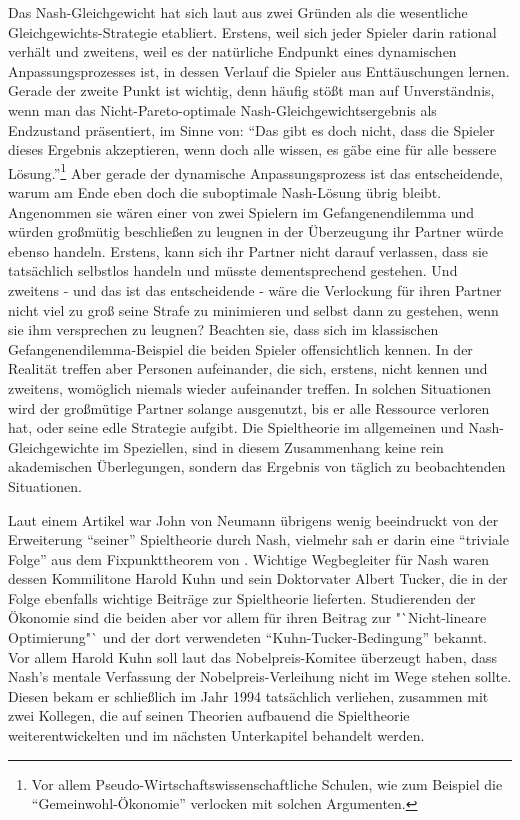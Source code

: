 Das Nash-Gleichgewicht hat sich laut \textcite[S. 61]{Holler2005} aus zwei Gründen als die wesentliche Gleichgewichts-Strategie etabliert. Erstens, weil sich jeder Spieler darin rational verhält und zweitens, weil es der natürliche Endpunkt eines dynamischen Anpassungsprozesses ist, in dessen Verlauf die Spieler aus Enttäuschungen lernen. Gerade der zweite Punkt ist wichtig, denn häufig stößt man auf Unverständnis, wenn man das Nicht-Pareto-optimale Nash-Gleichgewichtsergebnis als Endzustand präsentiert, im Sinne von: "`Das gibt es doch nicht, dass die Spieler dieses Ergebnis akzeptieren, wenn doch alle wissen, es gäbe eine für alle bessere Lösung."'\footnote{Vor allem Pseudo-Wirtschaftswissenschaftliche Schulen, wie zum Beispiel die "`Gemeinwohl-Ökonomie"' verlocken mit solchen Argumenten.} Aber gerade der dynamische Anpassungsprozess ist das entscheidende, warum am Ende eben doch die suboptimale Nash-Lösung übrig bleibt. Angenommen sie wären einer von zwei Spielern im Gefangenendilemma und würden großmütig beschließen zu leugnen in der Überzeugung ihr Partner würde ebenso handeln. Erstens, kann sich ihr Partner nicht darauf verlassen, dass sie tatsächlich selbstlos handeln und müsste dementsprechend gestehen. Und zweitens - und das ist das entscheidende - wäre die Verlockung für ihren Partner nicht viel zu groß seine Strafe zu minimieren und selbst dann zu gestehen, wenn sie ihm versprechen zu leugnen? Beachten sie, dass sich im klassischen Gefangenendilemma-Beispiel die beiden Spieler offensichtlich kennen. In der Realität treffen aber Personen aufeinander, die sich, erstens, nicht kennen und zweitens, womöglich niemals wieder aufeinander treffen. In solchen Situationen wird der großmütige Partner solange ausgenutzt, bis er alle Ressource verloren hat, oder seine edle Strategie aufgibt. Die Spieltheorie im allgemeinen und Nash-Gleichgewichte im Speziellen, sind in diesem Zusammenhang keine rein akademischen Überlegungen, sondern das Ergebnis von täglich zu beobachtenden Situationen.

Laut einem Artikel \textcite{Cassidy2015} war John von Neumann übrigens wenig beeindruckt von der Erweiterung "`seiner"' Spieltheorie durch Nash, vielmehr sah er darin eine "`triviale Folge"' aus dem Fixpunkttheorem von \textcite{Brouwer1912}. Wichtige Wegbegleiter für Nash waren dessen Kommilitone Harold Kuhn und sein Doktorvater Albert Tucker, die in der Folge ebenfalls wichtige Beiträge zur Spieltheorie lieferten. Studierenden der Ökonomie sind die beiden aber vor allem für ihren Beitrag zur "`Nicht-lineare Optimierung"` und der dort verwendeten "`Kuhn-Tucker-Bedingung"' \parencite{Kuhn1951} bekannt. Vor allem Harold Kuhn soll laut \textcite{Rubinstein2003} das Nobelpreis-Komitee überzeugt haben, dass Nash's mentale Verfassung der Nobelpreis-Verleihung nicht im Wege stehen sollte. Diesen bekam er schließlich im Jahr 1994 tatsächlich verliehen, zusammen mit zwei Kollegen, die auf seinen Theorien aufbauend die Spieltheorie weiterentwickelten und im nächsten Unterkapitel behandelt werden.


